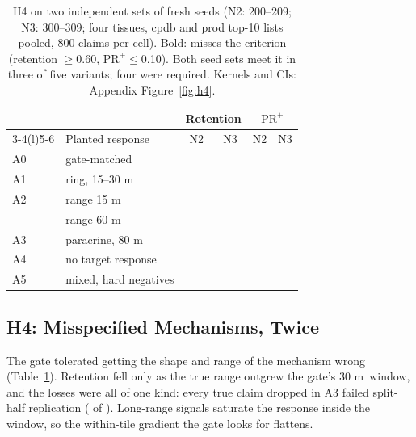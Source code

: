 \documentclass[letterpaper]{article} %
\newcommand{\um}{\ifmmode\,\text{\textmu m}\else\,\textmu m\fi}
\begin{document}
\begin{table}[t]
\centering
\small
\setlength{\tabcolsep}{3.5pt}
\begin{tabular}{@{}llcccc@{}}
\toprule
 & & \multicolumn{2}{c}{Retention} & \multicolumn{2}{c}{$\mathrm{PR}^{+}$} \\
\cmidrule(lr){3-4}\cmidrule(l){5-6}
 & Planted response & N2 & N3 & N2 & N3 \\
\midrule
A0 & gate-matched & \hfourAzeroRet{} & \hfourNthreeAzeroRet{} & \hfourAzeroPRafter{} & \hfourNthreeAzeroPRafter{} \\
A1 & ring, 15--30\um & \hfourAoneRet{} & \hfourNthreeAoneRet{} & \hfourAonePRafter{} & \hfourNthreeAonePRafter{} \\
A2 & range 15\um & \hfourAtwoaRet{} & \hfourNthreeAtwoaRet{} & \hfourAtwoaPRafter{} & \hfourNthreeAtwoaPRafter{} \\
   & range 60\um & \hfourAtwobRet{} & \hfourNthreeAtwobRet{} & \hfourAtwobPRafter{} & \hfourNthreeAtwobPRafter{} \\
A3 & paracrine, 80\um & \hfourAthreeRet{} & \hfourNthreeAthreeRet{} & \hfourAthreePRafter{} & \hfourNthreeAthreePRafter{} \\
A4 & no target response & \textbf{\hfourAfourRet{}} & \textbf{\hfourNthreeAfourRet{}} & \hfourAfourPRafter{} &
     \hfourNthreeAfourPRafter{} \\
A5 & mixed, hard negatives & \hfourAfiveRet{} & \hfourNthreeAfiveRet{} & \textbf{\hfourAfivePRafter{}} &
     \textbf{\hfourNthreeAfivePRafter{}} \\
\bottomrule
\end{tabular}
\caption{H4 on two independent sets of fresh seeds (N2: 200--209; N3: 300--309; four tissues, cpdb and prod top-10
lists pooled, 800 claims per cell). Bold: misses the criterion (retention $\geq$0.60, $\mathrm{PR}^{+}\leq$0.10). Both
seed sets meet it in three of five variants; four were required. Kernels and CIs: Appendix Figure~\ref{fig:h4}.}
\label{tab:h4}
\end{table}

\subsection{H4: Misspecified Mechanisms, Twice}
The gate tolerated getting the shape and range of the mechanism wrong (Table~\ref{tab:h4}). Retention fell only as the
true range outgrew the gate's 30\um\ window, and the losses were all of one kind: every true claim dropped in A3
failed split-half replication (\hfourFailAthreeSplitInconsistent{} of \hfourFailAthreeNTrueFailed{}). Long-range
signals saturate the response inside the window, so the within-tile gradient the gate looks for flattens.
\end{document}
